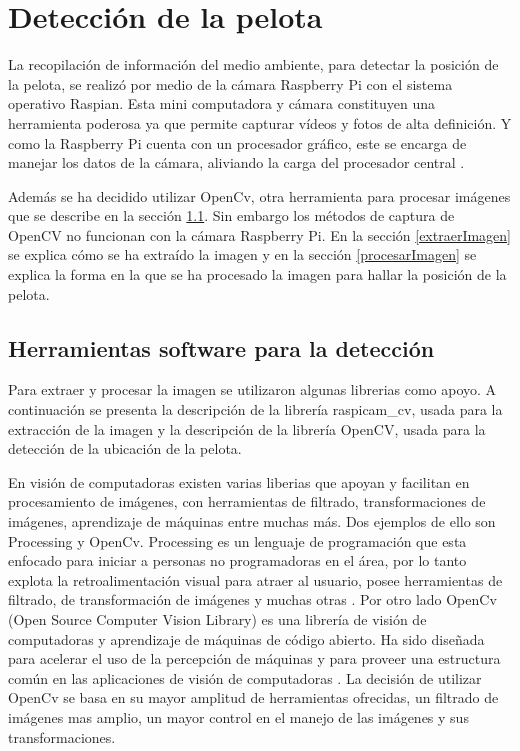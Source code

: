 \section{Detección de la pelota}\label{chapter:deteccion}

La recopilación de información del medio ambiente, para detectar la posición de la pelota, se realiz\'o por medio de la cámara Raspberry Pi con el sistema operativo Raspian. Esta mini computadora y cámara constituyen una herramienta poderosa ya que permite capturar v\'ideos y fotos de alta definici\'on. Y como la Raspberry Pi cuenta con un procesador gr\'afico, este se encarga de manejar los datos de la cámara, aliviando la carga del procesador central \cite{raspCamArti}.

Además se ha decidido utilizar OpenCv, otra herramienta para procesar im\'agenes que se describe en la sección \ref{herramientasDetc}. Sin embargo los métodos de captura de OpenCV no funcionan con la c\'amara Raspberry Pi. En la secci\'on \ref{extraerImagen} se explica c\'omo se ha extra\'ido la imagen y en la secci\'on \ref{procesarImagen} se explica la forma en la que se ha procesado la imagen para hallar la posición de la pelota. 

\subsection{Herramientas software para la detecci\'on }\label{herramientasDetc}

Para extraer y procesar la imagen se utilizaron algunas librerias como apoyo. A continuación se presenta la descripción de la librería raspicam\_cv, usada para la extracción de la imagen y la descripción de la librería OpenCV, usada para la detección de la ubicación de la pelota.   

En visi\'on de computadoras existen varias liberias que apoyan y facilitan en procesamiento de im\'agenes, con herramientas de filtrado, transformaciones de im\'agenes, aprendizaje de m\'aquinas entre muchas m\'as. Dos ejemplos de ello son Processing y OpenCv. Processing es un lenguaje de programaci\'on que esta enfocado para iniciar a personas no programadoras en el \'area, por lo tanto explota la retroalimentaci\'on visual para atraer al usuario, posee herramientas de filtrado, de transformaci\'on de im\'agenes y muchas otras \cite{processing}.
Por otro lado OpenCv (Open Source Computer Vision Library) es una librería de visión de computadoras y aprendizaje de máquinas de código abierto. Ha sido diseñada para acelerar el uso de la percepción de m\'aquinas y para proveer una estructura común en las aplicaciones de visión de computadoras \cite{opencv}. La decisi\'on de utilizar OpenCv se basa en su mayor amplitud de herramientas ofrecidas, un filtrado de im\'agenes mas amplio, un mayor control en el manejo de las im\'agenes y sus transformaciones.

